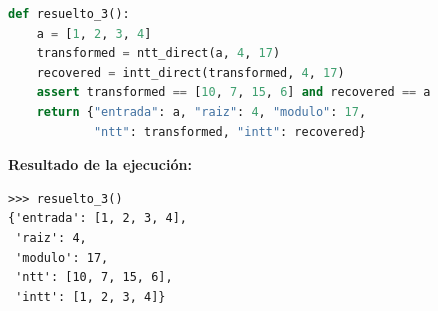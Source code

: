 \begin{lstlisting}[language=Python,caption={Ejercicio resuelto 3: NTT e INTT directa en F17}]
def resuelto_3():
    a = [1, 2, 3, 4]
    transformed = ntt_direct(a, 4, 17)
    recovered = intt_direct(transformed, 4, 17)
    assert transformed == [10, 7, 15, 6] and recovered == a
    return {"entrada": a, "raiz": 4, "modulo": 17,
            "ntt": transformed, "intt": recovered}
\end{lstlisting}
\noindent\textbf{Resultado de la ejecución:}
\begin{lstlisting}[style=consolestyle]
>>> resuelto_3()
{'entrada': [1, 2, 3, 4],
 'raiz': 4,
 'modulo': 17,
 'ntt': [10, 7, 15, 6],
 'intt': [1, 2, 3, 4]}
\end{lstlisting}
